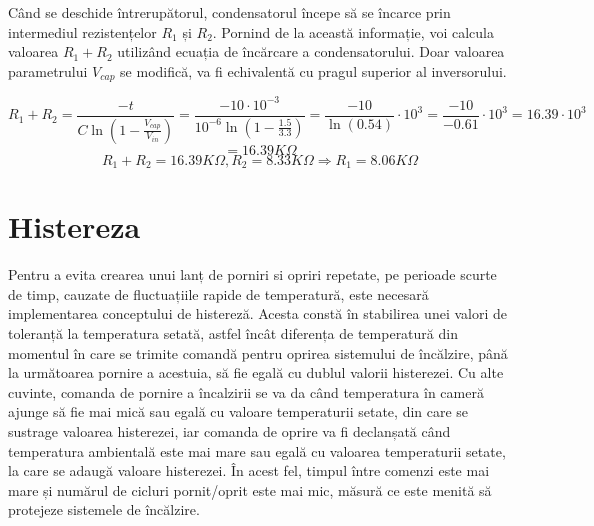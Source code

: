 	Când se deschide întrerupătorul, condensatorul începe să se încarce prin intermediul rezistențelor $R_1$ și $R_2$. Pornind de la această informație, voi calcula valoarea $R_1 + R_2$ utilizând ecuația de încărcare a condensatorului. Doar valoarea parametrului $V_{cap}$ se modifică, va fi echivalentă cu pragul superior al inversorului. 

\[
	R_1 + R_2 = \frac{-t}{C\ln(1 - \frac{V_{cap}}{V_{in}})} = \frac{-10 \cdot 10^{-3}}{10^{-6}\ln(1 - \frac{1.5}{3.3})} = \frac{-10}{\ln(0.54)}\cdot 10^3 =  \frac{-10}{-0.61}\cdot 10^3 = 16.39 \cdot 10^3
\]
\[
	 = 16.39 K\Omega
\]
\[
	R_1 + R_2 = 16.39 K\Omega, R_2 = 8.33 K\Omega \Rightarrow R_1 = 8.06 K\Omega
\]	
	
\section{Histereza}

	Pentru a evita crearea unui lanț de porniri si opriri repetate, pe perioade scurte de timp, cauzate de fluctuațiile rapide de temperatură, este necesară implementarea conceptului de histereză. Acesta constă în stabilirea unei valori de toleranță la temperatura setată, astfel încât diferența de temperatură din momentul în care se trimite comandă pentru oprirea sistemului de încălzire, până la următoarea pornire a acestuia, să fie egală cu dublul valorii histerezei. Cu alte cuvinte, comanda de pornire a încalzirii se va da când temperatura în cameră ajunge să fie mai mică sau egală cu valoare temperaturii setate, din care se sustrage valoarea histerezei, iar comanda de oprire va fi declanșată când temperatura ambientală este mai mare sau egală cu valoarea temperaturii setate, la care se adaugă valoare histerezei. În acest fel, timpul între comenzi este mai mare și numărul de cicluri pornit/oprit este mai mic, măsură ce este menită să protejeze sistemele de încălzire.


	 
 